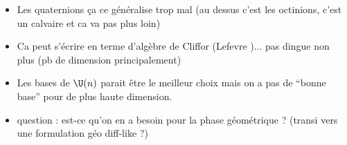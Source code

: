 \begin{itemize}
	\item Les quaternions ça ce généralise trop mal (au dessus c'est les octinions, c'est un calvaire et ca va pas plus loin)
	
	\item Ca peut s'écrire en terme d'algèbre de Cliffor (Lefevre \cite{lefevre_polarization_2021})... pas dingue non plus (pb de dimension principalement)
	
	\item Les bases de $\U(n)$ parait être le meilleur choix mais on a pas de ``bonne base'' pour de plus haute dimension.
	
	\item question : est-ce qu'on en a besoin pour la phase géométrique ? (transi vers une formulation géo diff-like ?)
\end{itemize}

